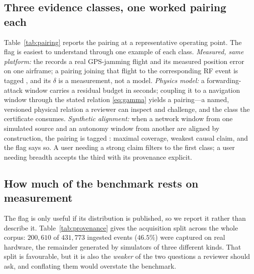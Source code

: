 \subsection{Three evidence classes, one worked pairing each}
Table~\ref{tab:pairing} reports the pairing at a representative operating point.
The  flag is easiest to understand through one example of
each class. \emph{Measured, same platform:} the 
records a real GPS-jamming flight and its measured position error on one
airframe; a pairing joining that flight to the corresponding RF event is tagged
, and its $\delta$ is a measurement, not a model.
\emph{Physics model:} a forwarding-attack window carries a residual budget in
seconds; coupling it to a navigation window through the stated relation
\eqref{eq:gamma} yields a  pairing---a named, versioned
physical relation a reviewer can inspect and challenge, and the class the
certificate consumes. \emph{Synthetic alignment:} when a network window from one
simulated source and an autonomy window from another are aligned by
construction, the pairing is tagged : maximal
coverage, weakest causal claim, and the flag says so. A user needing a strong
claim filters to the first class; a user needing breadth accepts the third with
its provenance explicit.

\subsection{How much of the benchmark rests on measurement}
\label{sec:provenance_dist}
The flag is only useful if its distribution is published, so we report it rather
than describe it. Table~\ref{tab:provenance} gives the acquisition split across
the whole corpus: $200{,}610$ of $431{,}773$ ingested events ($46.5\%$) were
captured on real hardware, the remainder generated by simulators of three
different kinds. That split is favourable, but it is also the \emph{weaker} of
the two questions a reviewer should ask, and conflating them would overstate the
benchmark.

